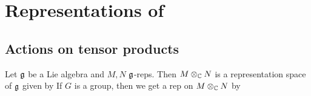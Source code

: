 \documentclass{article}
\begin{document}
\section{Representations of }

\subsection{Actions on tensor products}
Let $\mathfrak{g}$ be a Lie algebra and $M,N$ $\mathfrak{g}$-reps. Then $M \otimes_{\mathbb{C}}N$ is a representation space of $\mathfrak{g}$ given by 
If $G$ is a group, then we get a rep on $M \otimes_{\mathbb{C}} N$ by 

\begin{remark}

\end{remark}
\end{document}
